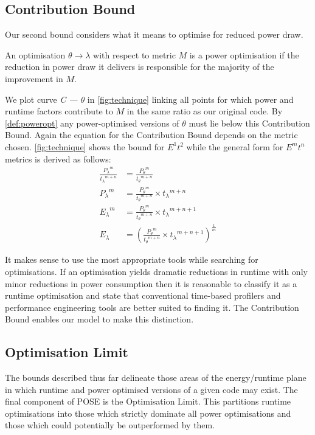 \subsection{Contribution Bound}
Our second bound considers what it means to optimise for reduced power draw.

\begin{definition}
An optimisation $\theta \to \lambda$ with respect to metric $M$ is a power optimisation if the reduction in power draw it delivers is responsible for the majority of the improvement in $M$.
\label{def:poweropt}
\end{definition}

We plot curve \emph{C --- $\theta$} in \autoref{fig:technique} linking all points for which power and runtime factors contribute to $M$ in the same ratio as our original code.
By \autoref{def:poweropt} any power-optimised versions of $\theta$ must lie below this Contribution Bound.
Again the equation for the Contribution Bound depends on the metric chosen. 
\autoref{fig:technique} shows the bound for $E^1t^2$ while the general form for $E^mt^n$ metrics is derived as follows:
\begin{align}
\frac{{P_{\lambda}}^m}{{t_{\lambda}}^{m+n}} &= \frac{{P_{\theta}}^m}{{t_{\theta}}^{m+n}} \nonumber \\
 {P_{\lambda}}^m &= \frac{{P_{\theta}}^m}{{t_{\theta}}^{m+n}} \times {t_\lambda}^{m+n} \nonumber \\ 
 {E_{\lambda}}^m &= \frac{{P_{\theta}}^m}{{t_{\theta}}^{m+n}} \times {t_\lambda}^{m+n+1} \nonumber \\ 
  E_{\lambda} &= (\frac{{P_{\theta}}^m}{{t_{\theta}}^{m+n}} \times {t_\lambda}^{m+n+1})^{\frac{1}{m}} 
\end{align}

It makes sense to use the most appropriate tools while searching for optimisations.
If an optimisation yields dramatic reductions in runtime with only minor reductions in power consumption then it is reasonable to classify it as a runtime optimisation and state that conventional time-based profilers and performance engineering tools are better suited to finding it.
The Contribution Bound enables our model to make this distinction.

\subsection{Optimisation Limit}
The bounds described thus far delineate those areas of the energy/runtime plane in which runtime and power optimised versions of a given code may exist.
The final component of POSE is the Optimisation Limit.
This partitions runtime optimisations into those which strictly dominate all power optimisations and those which could potentially be outperformed by them.

